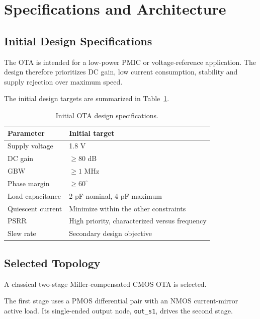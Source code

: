
\section{Specifications and Architecture}

\subsection{Initial Design Specifications}

The OTA is intended for a low-power PMIC or voltage-reference application.
The design therefore prioritizes DC gain, low current consumption, stability
and supply rejection over maximum speed.

The initial design targets are summarized in
Table~\ref{tab:initial_specs}.

\begin{table}[ht]
    \centering
    \caption{Initial OTA design specifications.}
    \label{tab:initial_specs}
    \begin{tabular}{ll}
        \hline
        Parameter & Initial target \\
        \hline
        Supply voltage & 1.8 V \\
        DC gain & $\geq 80$ dB \\
        GBW & $\geq 1$ MHz \\
        Phase margin & $\geq 60^\circ$ \\
        Load capacitance & 2 pF nominal, 4 pF maximum \\
        Quiescent current & Minimize within the other constraints \\
        PSRR & High priority, characterized versus frequency \\
        Slew rate & Secondary design objective \\
        \hline
    \end{tabular}
\end{table}


\subsection{Selected Topology}

A classical two-stage Miller-compensated CMOS OTA is selected.

The first stage uses a PMOS differential pair with an NMOS
current-mirror active load. Its single-ended output node,
\texttt{out\_s1}, drives the second stage.

